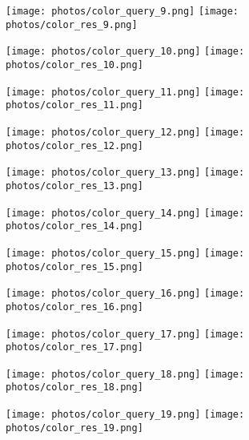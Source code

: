 \documentclass{article}
\begin{document}
\begin{figure}[!ht]
\centering
\texttt{[image: photos/color\_query\_9.png]}
\texttt{[image: photos/color\_res\_9.png]}
\end{figure}

\begin{figure}[!ht]
\centering
\texttt{[image: photos/color\_query\_10.png]}
\texttt{[image: photos/color\_res\_10.png]}
\end{figure}

\begin{figure}[!ht]
\centering
\texttt{[image: photos/color\_query\_11.png]}
\texttt{[image: photos/color\_res\_11.png]}
\end{figure}

\begin{figure}[!ht]
\centering
\texttt{[image: photos/color\_query\_12.png]}
\texttt{[image: photos/color\_res\_12.png]}
\end{figure}

\begin{figure}[!ht]
\centering
\texttt{[image: photos/color\_query\_13.png]}
\texttt{[image: photos/color\_res\_13.png]}
\end{figure}

\begin{figure}[!ht]
\centering
\texttt{[image: photos/color\_query\_14.png]}
\texttt{[image: photos/color\_res\_14.png]}
\end{figure}

\begin{figure}[!ht]
\centering
\texttt{[image: photos/color\_query\_15.png]}
\texttt{[image: photos/color\_res\_15.png]}
\end{figure}

\begin{figure}[!ht]
\centering
\texttt{[image: photos/color\_query\_16.png]}
\texttt{[image: photos/color\_res\_16.png]}
\end{figure}

\begin{figure}[!ht]
\centering
\texttt{[image: photos/color\_query\_17.png]}
\texttt{[image: photos/color\_res\_17.png]}
\end{figure}

\begin{figure}[!ht]
\centering
\texttt{[image: photos/color\_query\_18.png]}
\texttt{[image: photos/color\_res\_18.png]}
\end{figure}

\begin{figure}[!ht]
\centering
\texttt{[image: photos/color\_query\_19.png]}
\texttt{[image: photos/color\_res\_19.png]}
\end{figure}
\end{document}
